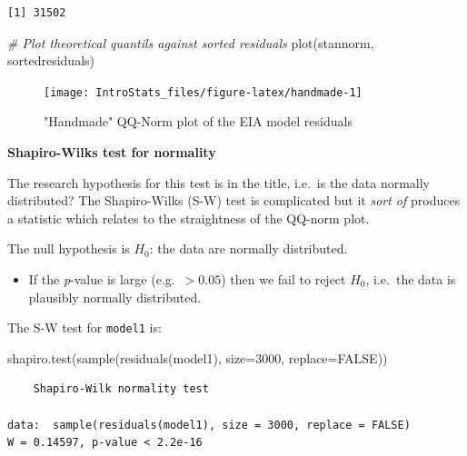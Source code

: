 \documentclass[
  oneside]{krantz}
\newenvironment{Shaded}{\begin{snugshade}}{\end{snugshade}}
\newcommand{\AttributeTok}[1]{\textcolor[rgb]{0.77,0.63,0.00}{#1}}
\newcommand{\CommentTok}[1]{\textcolor[rgb]{0.56,0.35,0.01}{\textit{#1}}}
\newcommand{\ConstantTok}[1]{\textcolor[rgb]{0.00,0.00,0.00}{#1}}
\newcommand{\DecValTok}[1]{\textcolor[rgb]{0.00,0.00,0.81}{#1}}
\newcommand{\FunctionTok}[1]{\textcolor[rgb]{0.00,0.00,0.00}{#1}}
\newcommand{\NormalTok}[1]{#1}
\providecommand{\tightlist}{%
  \setlength{\itemsep}{0pt}\setlength{\parskip}{0pt}}
\begin{document}
\begin{verbatim}
[1] 31502
\end{verbatim}

\begin{Shaded}
\begin{Highlighting}[]
\CommentTok{\# Plot theoretical quantils against sorted residuals}
\FunctionTok{plot}\NormalTok{(stannorm, sortedresiduals)}
\end{Highlighting}
\end{Shaded}

\begin{figure}

{\centering \texttt{[image: IntroStats\_files/figure-latex/handmade-1]} 

}

\caption{"Handmade" QQ-Norm plot of the EIA model residuals}\label{fig:handmade}
\end{figure}

\textbf{Shapiro-Wilks test for normality}

The research hypothesis for this test is in the title, i.e.~is the data normally distributed? The Shapiro-Wilks (S-W) test is complicated but it \emph{sort of} produces a statistic which relates to the straightness of the QQ-norm plot.

The null hypothesis is \(H_0\): the data are normally distributed.

\begin{itemize}
\tightlist
\item
  If the \emph{p}-value is large (e.g.~\(>0.05\)) then we fail to reject \(H_0\), i.e.~the data is plausibly normally distributed.
\end{itemize}

The S-W test for \texttt{model1} is:

\begin{Shaded}
\begin{Highlighting}[]
\FunctionTok{shapiro.test}\NormalTok{(}\FunctionTok{sample}\NormalTok{(}\FunctionTok{residuals}\NormalTok{(model1), }\AttributeTok{size=}\DecValTok{3000}\NormalTok{, }\AttributeTok{replace=}\ConstantTok{FALSE}\NormalTok{))}
\end{Highlighting}
\end{Shaded}

\begin{verbatim}
    Shapiro-Wilk normality test

data:  sample(residuals(model1), size = 3000, replace = FALSE)
W = 0.14597, p-value < 2.2e-16
\end{verbatim}
\end{document}
